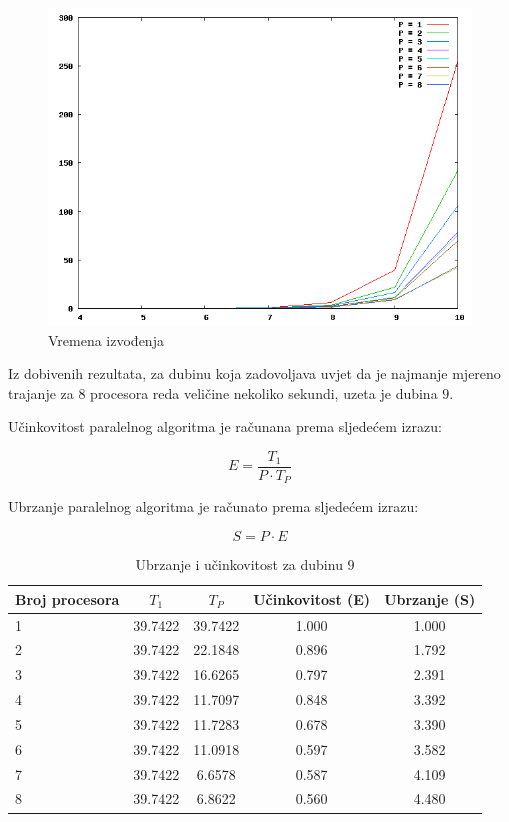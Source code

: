 \documentclass[11pt]{article}
\begin{document}
\clearpage

\begin{figure}[!htb]	
	\centering
	\includegraphics[width=1\textwidth]{times.png}
	\caption{Vremena izvođenja}
\end{figure}

Iz dobivenih rezultata, za dubinu koja zadovoljava uvjet da je najmanje mjereno trajanje za 8 procesora reda veličine nekoliko sekundi, uzeta je dubina $9$.

Učinkovitost paralelnog algoritma je računana prema sljedećem izrazu:

$$E = \frac{T_1}{P \cdot T_P}$$

Ubrzanje paralelnog algoritma je računato prema sljedećem izrazu:

$$S = P \cdot E$$

\begin{table}[h]
\begin{center}
\begin{tabular}{l*{4}{c}}
Broj procesora & $T_1$ & $T_P$ & Učinkovitost (E) & Ubrzanje (S)  \\
\hline
1 & 39.7422 & 39.7422 & 1.000 & 1.000 \\

2 & 39.7422 & 22.1848 & 0.896 & 1.792 \\

3 & 39.7422 & 16.6265 & 0.797 & 2.391 \\

4 & 39.7422 & 11.7097 & 0.848 & 3.392 \\

5 & 39.7422 & 11.7283 & 0.678 & 3.390 \\

6 & 39.7422 & 11.0918 & 0.597 & 3.582 \\

7 & 39.7422 & 6.6578 & 0.587 & 4.109  \\

8 & 39.7422 & 6.8622 & 0.560 & 4.480  \\

\end{tabular}
\end{center}
\caption{Ubrzanje i učinkovitost za dubinu $9$}
\end{table}
\end{document}
